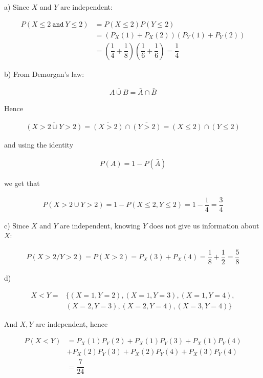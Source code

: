 a) Since $X$ and $Y$ are independent:

\begin{align*}
  P(X \leq 2\ \texttt{and}\ Y \leq 2) &= P(X \leq 2) P(Y \leq 2) \\
                                      &= (P_X(1) + P_X(2))(P_Y(1) + P_Y(2)) \\
                                      &= (\dfrac{1}{4} + \dfrac{1}{8}) (\dfrac{1}{6} + \dfrac{1}{6}) = \dfrac{1}{4}
\end{align*}

b) From Demorgan's law:

\begin{align*}
  \overline{A \cup B} = \bar{A} \cap \bar{B}
\end{align*}

Hence

\begin{align*}
  \overline{(X > 2 \cup Y > 2)} = \overline{(X > 2)} \cap \overline{(Y > 2)} = (X \leq 2) \cap (Y \leq 2)
\end{align*}

and using the identity

\begin{align*}
  P(A) = 1 - P(\bar{A})
\end{align*}

we get that

\begin{align*}
  P(X > 2 \cup Y > 2) = 1 - P(X \leq 2, Y \leq 2) = 1 - \dfrac{1}{4} = \dfrac{3}{4}
\end{align*}

c) Since $X$ and $Y$ are independent, knowing $Y$ does not give us information about $X$:

\begin{align*}
  P(X > 2 / Y > 2) = P(X > 2) = P_X(3) + P_X(4) = \dfrac{1}{8} + \dfrac{1}{2} = \dfrac{5}{8}
\end{align*}

d)

\begin{align*}
  X < Y = &\{(X = 1, Y = 2), (X = 1, Y = 3), (X = 1, Y = 4), \\
          &(X = 2, Y = 3), (X = 2, Y = 4), (X = 3, Y = 4)\}
\end{align*}

And $X,Y$ are independent, hence

\begin{align*}
  P(X < Y) &= P_X(1)P_Y(2) + P_X(1)P_Y(3) + P_X(1)P_Y(4) \\
           &+ P_X(2)P_Y(3) + P_X(2)P_Y(4) + P_X(3)P_Y(4) \\
           &= \dfrac{7}{24}
\end{align*}
